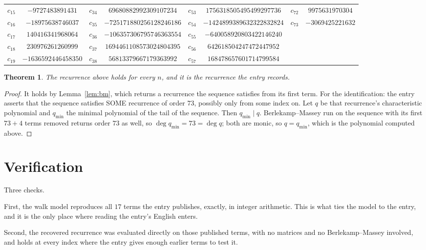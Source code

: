 \documentclass[11pt,a4paper]{article}
\theoremstyle{plain}
\newtheorem{theorem}{Theorem}
\theoremstyle{definition}
\begin{document}
\begin{center}
\begin{tabular}{cccccccc}
$c_{15}$ & $-9727483891431$ & $c_{34}$ & $69680882992309107234$ & $c_{53}$ & $1756318505495499297736$ & $c_{72}$ & $9975631970304$ \\
$c_{16}$ & $-18975638746037$ & $c_{35}$ & $-725171880256128246186$ & $c_{54}$ & $-1424899389632322832824$ & $c_{73}$ & $-3069425221632$ \\
$c_{17}$ & $140416341968064$ & $c_{36}$ & $-106357306795746363554$ & $c_{55}$ & $-640058920803422146240$ &  &  \\
$c_{18}$ & $230976261260999$ & $c_{37}$ & $1694461108573024804395$ & $c_{56}$ & $642618504247472447952$ &  &  \\
$c_{19}$ & $-1636592446458350$ & $c_{38}$ & $56813379667179363992$ & $c_{57}$ & $168478657601714799584$ &  &  \\
\end{tabular}
\end{center}

\begin{theorem}
The recurrence above holds for every $n$, and it is the recurrence the entry records.
\end{theorem}

\begin{proof}
It holds by Lemma~\ref{lem:bm}, which returns a recurrence the sequence satisfies from its
first term. For the identification: the entry asserts that the sequence satisfies SOME
recurrence of order $73$, possibly only from some index on. Let $q$ be that recurrence's
characteristic polynomial and $q_{\min}$ the minimal polynomial of the tail of the sequence.
Then $q_{\min}\mid q$. Berlekamp--Massey run on the sequence with its first $73+4$ terms
removed returns order $73$ as well, so $\deg q_{\min}=73=\deg q$; both are monic, so
$q=q_{\min}$, which is the polynomial computed above.
\end{proof}

\section{Verification}

Three checks.

First, the walk model reproduces all $17$ terms the entry publishes, exactly, in integer
arithmetic. This is what ties the model to the entry, and it is the only place where reading
the entry's English enters.

Second, the recovered recurrence was evaluated directly on those published terms, with no
matrices and no Berlekamp--Massey involved, and holds at every index where the entry gives
enough earlier terms to test it.
\end{document}

